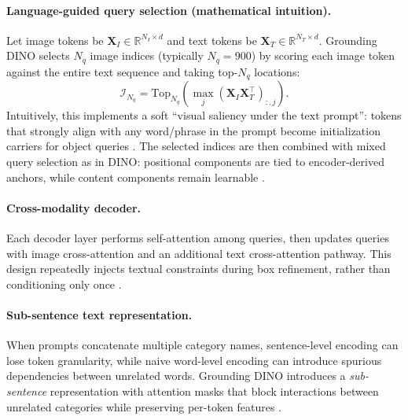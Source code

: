\documentclass{report}
\begin{document}
\paragraph{Language-guided query selection (mathematical intuition).}
Let image tokens be $\mathbf{X}_I\in\mathbb{R}^{N_I\times d}$ and text tokens be $\mathbf{X}_T\in\mathbb{R}^{N_T\times d}$. Grounding DINO selects $N_q$ image indices (typically $N_q=900$) by scoring each image token against the entire text sequence and taking top-$N_q$ locations:
\[
\mathcal{I}_{N_q}=\mathrm{Top}_{N_q}\!\left(\max_{j}(\mathbf{X}_I\mathbf{X}_T^\top)_{:,j}\right).
\]
Intuitively, this implements a soft ``visual saliency under the text prompt'': tokens that strongly align with any word/phrase in the prompt become initialization carriers for object queries \cite{liu2023groundingdino}. The selected indices are then combined with mixed query selection as in DINO: positional components are tied to encoder-derived anchors, while content components remain learnable \cite{liu2023groundingdino}.

\paragraph{Cross-modality decoder.}
Each decoder layer performs self-attention among queries, then updates queries with image cross-attention and an additional text cross-attention pathway. This design repeatedly injects textual constraints during box refinement, rather than conditioning only once \cite{liu2023groundingdino}.

\paragraph{Sub-sentence text representation.}
When prompts concatenate multiple category names, sentence-level encoding can lose token granularity, while naive word-level encoding can introduce spurious dependencies between unrelated words. Grounding DINO introduces a \emph{sub-sentence} representation with attention masks that block interactions between unrelated categories while preserving per-token features \cite{liu2023groundingdino}.
\end{document}
